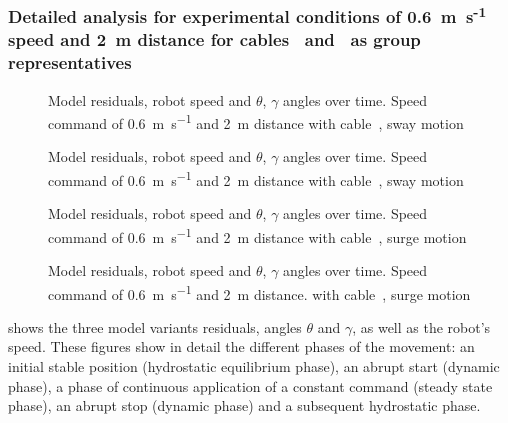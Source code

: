 \subsubsection{Detailed analysis for experimental conditions of 0.6~m~s\textsuperscript{-1} speed and 2~m distance for cables~
	and~ as group representatives}

\begin{figure}
	\centering
	\caption{
		Model residuals, robot speed and $\theta$, $\gamma$ angles over time. Speed command of \qty{0.6}{\m\per\s} and
		\qty{2}{\m} distance with cable~, sway motion
	}
	\label{cable_modelization_fig_sequences_cable3sway}
\end{figure}

\begin{figure}
	\centering
	\caption{
		Model residuals, robot speed and $\theta$, $\gamma$ angles over time. Speed command of \qty{0.6}{\m\per\s} and
		\qty{2}{\m} distance with cable~, sway motion
	}
	\label{cable_modelization_fig_sequences_cable6sway}
\end{figure}

\begin{figure}
	\centering
	\caption{
		Model residuals, robot speed and $\theta$, $\gamma$ angles over time. Speed command of \qty{0.6}{\m\per\s} and
		\qty{2}{\m} distance with cable~, surge motion
	}
	\label{cable_modelization_fig_sequences_cable3surge}
\end{figure}

\begin{figure}
	\centering
	\caption{
		Model residuals, robot speed and $\theta$, $\gamma$ angles over time. Speed command of \qty{0.6}{\m\per\s} and
		\qty{2}{\m} distance. with cable~, surge motion
	}
	\label{cable_modelization_fig_sequences_cable6surge}
\end{figure}

shows the three model variants residuals, angles $\theta$ and $\gamma$, as well as the robot's
speed. These figures show in detail the different phases of the movement: an initial stable
position (hydrostatic equilibrium phase), an abrupt start (dynamic phase), a phase of continuous
application of a constant command (steady state phase), an abrupt stop (dynamic phase) and a
subsequent hydrostatic phase.

